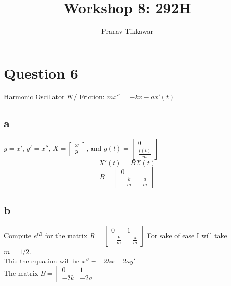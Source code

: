 \documentclass{article}
\author{Pranav Tikkawar}
\title{Workshop 8: 292H}
\begin{document}
\maketitle
\section*{Question 6}
Harmonic Oscillator W/ Friction: $mx'' = - kx - ax'(t)$
\subsection*{a}
$y = x'$, $y' = x''$, $X = \begin{bmatrix}
    x\\
    y
\end{bmatrix}$, and $g(t) = \begin{bmatrix}
    0\\
    \frac{f(t)}{m}
\end{bmatrix}$
$$X'(t) = BX(t)$$
$$B = \begin{bmatrix}
    0 & 1\\
    -\frac{k}{m} & -\frac{a}{m}
\end{bmatrix}$$
\subsection*{b}
Compute $e^{tB}$ for the matrix $B = \begin{bmatrix}
    0 & 1\\
    -\frac{k}{m} & -\frac{a}{m}
\end{bmatrix}$
For sake of ease I will take $m = 1/2$. \\
This the equation will be $x'' = -2kx - 2ay'$\\
The matrix $B = \begin{bmatrix}
    0 & 1\\
    -2k & -2a
\end{bmatrix}$\\
\end{document}
